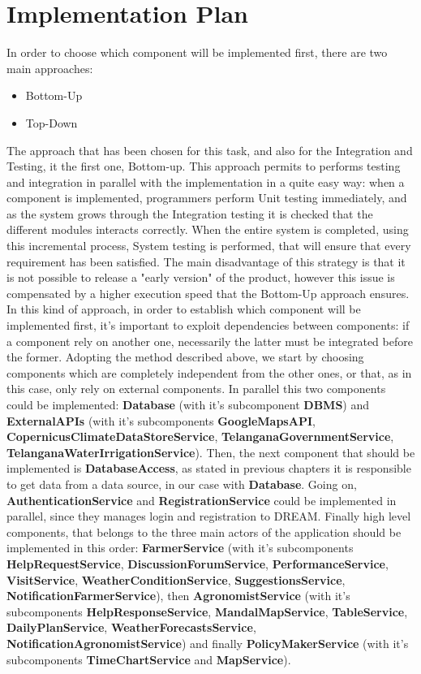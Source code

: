\section{Implementation Plan}

In order to choose which component will be implemented first, there are two main approaches:
\begin{itemize}
    \item Bottom-Up
    \item Top-Down 
\end{itemize}
The approach that has been chosen for this task, and also for the Integration and Testing, it the first one, Bottom-up.
This approach permits to performs testing and integration in parallel with the implementation in a quite easy way: when a component is implemented, programmers perform Unit testing immediately, and as the system grows through the Integration testing it is checked that the different modules interacts correctly. When the entire system is completed, using this incremental process, System testing is performed, that will ensure that every requirement has been satisfied.
The main disadvantage of this strategy is that it is not possible to release a "early version" of the product, however this issue is compensated by a higher execution speed that the Bottom-Up approach ensures.
In this kind of approach, in order to establish which component will be implemented first, it's important to exploit dependencies between components: if a component rely on another one, necessarily the latter must be integrated before the former.
Adopting the method described above, we start by choosing components which are completely independent from the other ones, or that, as in this case, only rely on external components.
In parallel this two components could be implemented: \textbf{Database} (with it's subcomponent \textbf{DBMS}) and \textbf{ExternalAPIs} (with it's subcomponents \textbf{GoogleMapsAPI}, \textbf{CopernicusClimateDataStoreService}, \textbf{TelanganaGovernmentService}, \textbf{TelanganaWaterIrrigationService}).
Then, the next component that should be implemented is \textbf{DatabaseAccess}, as stated in previous chapters it is responsible to get data from a data source, in our case with \textbf{Database}.
Going on, \textbf{AuthenticationService} and \textbf{RegistrationService} could be implemented in parallel, since they manages login and registration to DREAM.
Finally high level components, that belongs to the three main actors of the application should be implemented in this order: \textbf{FarmerService} (with it's subcomponents \textbf{HelpRequestService}, \textbf{DiscussionForumService}, \textbf{PerformanceService}, \textbf{VisitService}, \textbf{WeatherConditionService}, \textbf{SuggestionsService}, \textbf{NotificationFarmerService}), then \textbf{AgronomistService} (with it's subcomponents \textbf{HelpResponseService}, \textbf{MandalMapService}, \textbf{TableService}, \textbf{DailyPlanService}, \textbf{WeatherForecastsService}, \textbf{NotificationAgronomistService}) and finally \textbf{PolicyMakerService} (with it's subcomponents \textbf{TimeChartService} and \textbf{MapService}).

